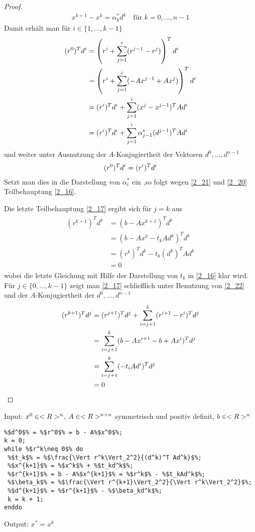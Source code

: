 \begin{proof}
	\begin{align}
		\label{2_21}
		x^{k+1} -x^k = \alpha_k^\ast d^k\quad\text{für } k=0,...,n-1
	\end{align}
	Damit erhält man für $i\in\{1,...,k-1\}$
	\begin{align}
		(r^0)^T d^i &= \left(r^i + \sum_{j=1}^{i} (r^{j-1}-r^j)\right)^Td^i \notag \\
		&= \left(r^i + \sum_{j=1}^i (-Ax^{j-1} + Ax^j)\right)^T d^i \notag \\
		&= (r^i)^Td^i + \sum_{j=1}^i (x^j-x^{j-1})^T Ad^i \notag \\
		&= (r^i)^Td^i + \sum_{j=1}^i \alpha^\ast_{j-1}(d^{j-1})^TAd^i \notag
	\end{align}
	und weiter unter Ausnutzung der $A$-Konjugiertheit der Vektoren $d^0,...,d^{n-1}$
	\begin{align}
		(r^0)^Td^i = (r^i)^Td^i\notag
	\end{align}
	Setzt man dies in die Darstellung von $\alpha_i^\ast$ ein ,so folgt wegen \cref{2_21} und \cref{2_20} Teilbehauptung \cref{2_16}.
	
	Die letzte Teilbehauptung \cref{2_17} ergibt sich für $j=k$ aus
	\begin{align}
		\label{2_22}
		\begin{split}
		(r^{k+1})^Td^k &= (b-Ax^{k+1})^Td^k \\
		&= (b-Ax^k-t_kAd^k)^Td^k \\
		&= (r^k)^Td^k-t_k(d^k)^TAd^k \\
		&= 0
		\end{split}
	\end{align}
	wobei die letzte Gleichung mit Hilfe der Darstellung von $t_k$ in \cref{2_16} klar wird. Für $j\in\{0,...,k-1\}$ zeigt man \cref{2_17} schließlich unter Benutzung von \cref{2_22} und der $A$-Konjugiertheit der $d^0,...,d^{n-1}$
	\begin{align}
		(r^{k+1})^Td^j &= (r^{j+1})^Td^j + \sum_{i=j+1}^k (r^{i+1}-r^i)^Td^j \notag \\
		&= \sum_{i=j+1}^k (b-Ax^{i+1}-b+Ax^i)^Td^j \notag \\
		&= \sum_{i=j+1}^k (-t_iAd^i)^Td^j \notag \\
		&= 0 \notag
	\end{align}
\end{proof}

\begin{algorithm}[CG-Verfahren]
	Input: $x^0\in<R>^n$, $A\in<R>^{n \times n}$ symmetrisch und positiv definit, $b\in<R>^n$
	\begin{lstlisting}
%$d^0$% = %$r^0$% = b - A%$x^0$%;
k = 0;
while %$r^k\neq 0$% do
 %$t_k$% = %$\frac{\Vert r^k\Vert_2^2}{(d^k)^T Ad^k}$%;
 %$x^{k+1}$% = %$x^k$% + %$t_kd^k$%;
 %$r^{k+1}$% = b - A%$x^{k+1}$% = %$r^k$% - %$t_kAd^k$%;
 %$\beta_k$% = %$\frac{\Vert r^{k+1}\Vert_2^2}{\Vert r^k\Vert_2^2}$%;
 %$d^{k+1}$% = %$r^{k+1}$% - %$\beta_kd^k$%;
 k = k + 1;
enddo
	\end{lstlisting}
	Output: $x^\ast=x^k$
\end{algorithm}

